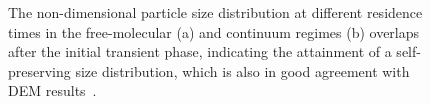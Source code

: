 \begin{figure}[H]
\begin{subfigure}[t]{0.4\textwidth}
	\end{subfigure}
	\caption{The non-dimensional particle size distribution at different residence times in the free-molecular (a) and continuum regimes (b) overlaps after the initial transient phase, indicating the attainment of a self-preserving size distribution, which is also in good agreement with DEM results~\citep{goudeli2015coagulation}.}
	\label{fig:coagvalid_psd} 
\end{figure}


